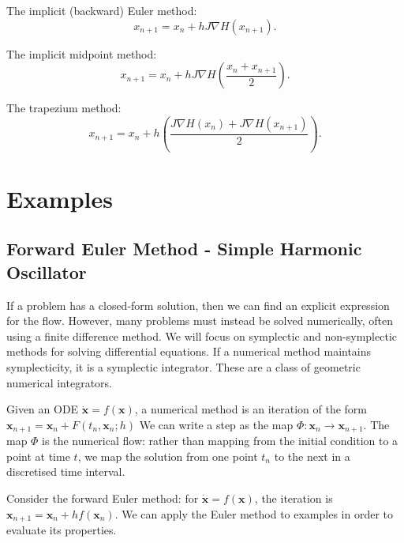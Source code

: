 \documentclass{report}
\theoremstyle{exampstyle} \newtheorem{example}[theorem]{Example}
\theoremstyle{exampstyle} \newtheorem{remark}[theorem]{Remark}
\theoremstyle{exampstyle} \newtheorem{definition}[theorem]{Definition}
\theoremstyle{exampstyle} \newtheorem{lemma}[theorem]{Lemma}
\begin{document}
The implicit (backward) Euler method:
\begin{equation}
	x_{n+1} = x_n + h J \nabla H(x_{n+1}).
\end{equation}

The implicit midpoint method:
\begin{equation}
	x_{n+1} = x_n + h J \nabla H \left( \frac{x_n + x_{n+1}}{2} \right).
\end{equation}

The trapezium method:
\begin{equation}
	x_{n+1} = x_n + h \left( \frac{J \nabla H(x_n) + J \nabla H(x_{n+1})}{2} \right).
\end{equation}

\section{Examples}
\subsection{Forward Euler Method - Simple Harmonic Oscillator}

If a problem has a closed-form solution, then we can find an explicit expression for the flow.
However, many problems must instead be solved numerically, often using a finite difference method.
We will focus on symplectic and non-symplectic methods for solving differential equations.
If a numerical method maintains symplecticity, it is a symplectic integrator.
These are a class of geometric numerical integrators.

Given an ODE $\dot{\mathbf{x}} = f(\mathbf{x})$, a numerical method is an iteration of the form $\mathbf{x}_{n+1} = \mathbf{x}_n + F(t_n, \mathbf{x}_n; h)$
We can write a step as the map $\Phi: \mathbf{x}_n \rightarrow \mathbf{x}_{n+1}$. The map $\Phi$ is the numerical flow:
rather than mapping from the initial condition to a point at time $t$, we map the solution from one point $t_n$ to the next in a discretised time interval.

Consider the forward Euler method: for $\dot{\mathbf{x}} = f(\mathbf{x})$, the iteration is $\mathbf{x}_{n+1} = \mathbf{x}_n + hf(\mathbf{x}_n)$.
We can apply the Euler method to examples in order to evaluate its properties.
\end{document}
